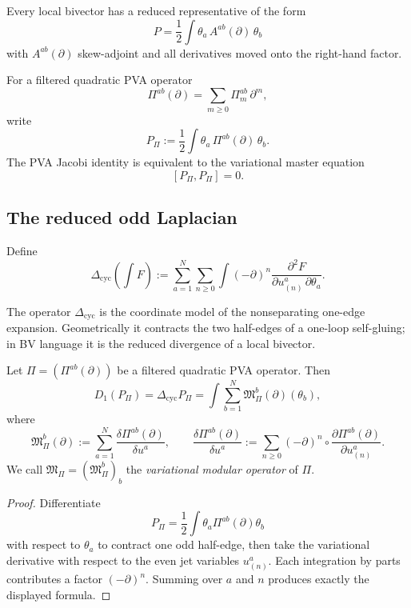 Every local bivector has a reduced representative of the form
\[
P=\frac12\int \theta_a\,A^{ab}(\partial)\,\theta_b
\]
with $A^{ab}(\partial)$ skew-adjoint and all derivatives moved onto the right-hand factor.

For a filtered quadratic PVA operator
\[
\Pi^{ab}(\partial)=\sum_{m\ge 0}\Pi_m^{ab}\,\partial^m,
\]
write
\[
P_\Pi:=\frac12\int \theta_a\,\Pi^{ab}(\partial)\,\theta_b.
\]
The PVA Jacobi identity is equivalent to the variational master equation
\[
[P_\Pi,P_\Pi]=0.
\]

\subsection{The reduced odd Laplacian}

\begin{definition}
Define
\[
\Delta_{\mathrm{cyc}}\!\left(\int F\right)
:=
\sum_{a=1}^N\sum_{n\ge 0}
\int
(-\partial)^n
\frac{\partial^2 F}{\partial u^a_{(n)}\,\partial \theta_a}.
\]
\end{definition}

\begin{remark}[Interpretation]
The operator $\Delta_{\mathrm{cyc}}$ is the coordinate model of the nonseparating one-edge
expansion. Geometrically it contracts the two half-edges of a one-loop self-gluing; in BV
language it is the reduced divergence of a local bivector.
\end{remark}

\begin{theorem}\label{thm:D1formula}
Let $\Pi=(\Pi^{ab}(\partial))$ be a filtered quadratic PVA operator. Then
\[
D_1(P_\Pi)=\Delta_{\mathrm{cyc}}P_\Pi
=
\int \sum_{b=1}^N \mathfrak M_\Pi^b(\partial)(\theta_b),
\]
where
\[
\mathfrak M_\Pi^b(\partial)
:=
\sum_{a=1}^N \frac{\delta \Pi^{ab}(\partial)}{\delta u^a},
\qquad
\frac{\delta \Pi^{ab}(\partial)}{\delta u^a}
:=
\sum_{n\ge 0}(-\partial)^n\circ
\frac{\partial \Pi^{ab}(\partial)}{\partial u^a_{(n)}}.
\]
We call $\mathfrak M_\Pi=(\mathfrak M_\Pi^b)_b$ the \emph{variational modular operator}
of $\Pi$.
\end{theorem}

\begin{proof}
Differentiate
\[
P_\Pi=\frac12\int \theta_a\Pi^{ab}(\partial)\theta_b
\]
with respect to $\theta_a$ to contract one odd half-edge, then take the variational
derivative with respect to the even jet variables $u^a_{(n)}$. Each integration by parts
contributes a factor $(-\partial)^n$. Summing over $a$ and $n$ produces exactly the
displayed formula.
\end{proof}

